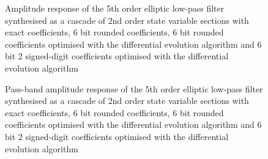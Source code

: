 \documentclass[a4paper,twoside,10pt,english]{report}
\begin{document}
\begin{figure}[!htbp]
\begin{center}
\scalebox{0.7}{}
\caption{Amplitude response of the 5th order elliptic low-pass
filter synthesised as a cascade of 2nd order state variable sections with 
exact coefficients, 6 bit rounded coefficients, 6 bit rounded coefficients 
optimised with the differential evolution algorithm and 6 bit 2 signed-digit 
coefficients optimised with the differential evolution algorithm}
\label{fig:de_min_svcasc_response}
\end{center}
\end{figure}
\begin{figure}[!htbp]
\begin{center}
\scalebox{0.7}{}
\caption{Pass-band amplitude response of the 5th order elliptic low-pass
filter synthesised as a cascade of 2nd order state variable sections with
exact coefficients, 6 bit rounded coefficients, 6 bit rounded coefficients 
optimised with the differential evolution algorithm
and 6 bit 2 signed-digit coefficients optimised with the differential
evolution algorithm}
\label{fig:de_min_svcasc_passband_response}
\end{center}
\end{figure}
\clearpage{}
\end{document}
